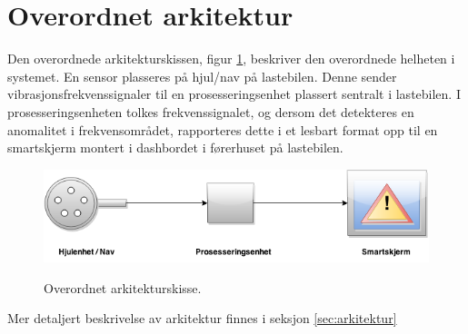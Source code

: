 \section{Overordnet arkitektur}
Den overordnede arkitekturskissen, figur \ref{fig:overordnet-ark}, 
beskriver den overordnede helheten i systemet. En sensor plasseres på 
hjul/nav på lastebilen. Denne sender vibrasjonsfrekvenssignaler til en 
prosesseringsenhet plassert sentralt i lastebilen. I prosesseringsenheten 
tolkes frekvenssignalet, og dersom det detekteres en anomalitet i 
frekvensområdet, rapporteres dette i et lesbart format opp til en 
smartskjerm montert i dashbordet i førerhuset på lastebilen.
\newline
\begin{figure}[H]
	\centering
	\includegraphics[width=1.00\textwidth]{images/arkitektur-overordnet.png}
	\label{fig:overordnet-ark}
	\caption{Overordnet arkitekturskisse.}
\end{figure}

Mer detaljert beskrivelse av arkitektur finnes i seksjon \ref{sec:arkitektur}
